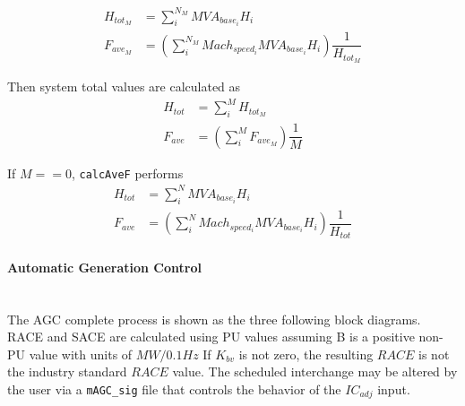 \documentclass[12pt]{article}
\begin{document}
\begin{align*}
%             
%         
H_{tot_M} &= \sum_{i}^{N_M} MVA_{base_i}H_i \\
F_{ave_M} &= \left( \sum_{i}^{N_M}Mach_{speed_i}MVA_{base_i}H_i \right) \dfrac{1}{H_{tot_M}}
\end{align*}

Then system total values are calculated as
\begin{align*}
H_{tot} &= \sum_{i}^{M} H_{tot_M} \\
F_{ave} &= \left( \sum_{i}^{M} F_{ave_M} \right) \dfrac{1}{M}
\end{align*}

If $M==0$, \verb|calcAveF| performs
\begin{align*}
H_{tot} &= \sum_{i}^{N} MVA_{base_i}H_i \\
F_{ave} &= \left( \sum_{i}^{N}Mach_{speed_i}MVA_{base_i}H_i \right) \dfrac{1}{H_{tot}}
\end{align*}


\pagebreak
\paragraph{Automatic Generation Control} \ \\
The AGC complete process is shown as the three following block diagrams.
RACE and SACE are calculated using PU values assuming B is a positive non-PU value with units of $MW/0.1Hz$
If $K_{bv}$ is not zero, the resulting $RACE$ is not the industry standard $RACE$ value.
The scheduled interchange may be altered by the user via a \verb|mAGC_sig| file that controls the behavior of the $IC_{adj}$ input.
\end{document}
